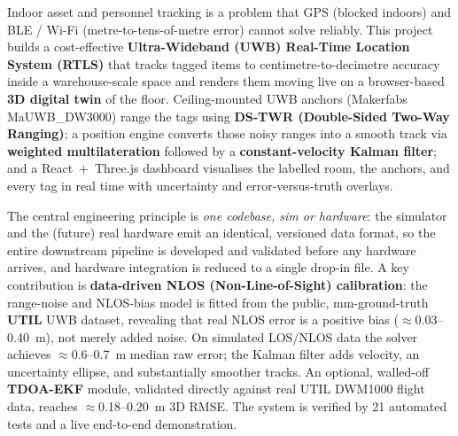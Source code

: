 \documentclass[a4paper,12pt,onecolumn]{report}
\begin{document}
Indoor asset and personnel tracking is a problem that GPS (blocked indoors) and
BLE / Wi-Fi (metre-to-tens-of-metre error) cannot solve reliably. This project
builds a cost-effective \textbf{Ultra-Wideband (UWB) Real-Time Location System
(RTLS)} that tracks tagged items to centimetre-to-decimetre accuracy inside a
warehouse-scale space and renders them moving live on a browser-based \textbf{3D
digital twin} of the floor. Ceiling-mounted UWB anchors (Makerfabs
MaUWB\_DW3000) range the tags using \textbf{DS-TWR (Double-Sided Two-Way
Ranging)}; a position engine converts those noisy ranges into a smooth track via
\textbf{weighted multilateration} followed by a \textbf{constant-velocity Kalman
filter}; and a React~+~Three.js dashboard visualises the labelled room, the
anchors, and every tag in real time with uncertainty and error-versus-truth
overlays.

The central engineering principle is \emph{one codebase, sim or hardware}: the
simulator and the (future) real hardware emit an identical, versioned data
format, so the entire downstream pipeline is developed and validated before any
hardware arrives, and hardware integration is reduced to a single drop-in file.
A key contribution is \textbf{data-driven NLOS (Non-Line-of-Sight) calibration}:
the range-noise and NLOS-bias model is fitted from the public, mm-ground-truth
\textbf{UTIL} UWB dataset, revealing that real NLOS error is a positive bias
($\approx$0.03--0.40~m), not merely added noise. On simulated LOS/NLOS data the
solver achieves $\approx$0.6--0.7~m median raw error; the Kalman filter adds
velocity, an uncertainty ellipse, and substantially smoother tracks. An optional,
walled-off \textbf{TDOA-EKF} module, validated directly against real UTIL
DWM1000 flight data, reaches $\approx$0.18--0.20~m 3D RMSE. The system is
verified by 21 automated tests and a live end-to-end demonstration.

\tableofcontents

\listoftables
{}

\listoffigures
{}
\end{document}
